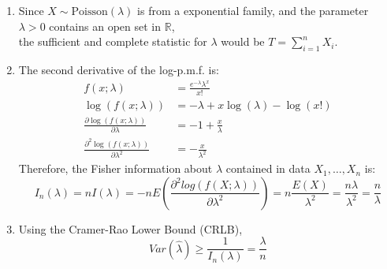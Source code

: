 \documentclass{article}
\begin{document}
\begin{enumerate}
\begin{enumerate}[label=(\roman*)]
    \item Since $X \sim \text{Poisson}(\lambda)$ is from a exponential family, and the parameter $\lambda > 0$ contains an open set in $\mathbb{R}$, \\
    the sufficient and complete statistic for $\lambda$ would be $T = \sum_{i=1}^n X_i$.

    \item The second derivative of the log-p.m.f. is:
    \begin{align*}
    f(x; \lambda) &= \frac{e^{-\lambda} \lambda^x}{x!} \\
    \log(f(x; \lambda)) &= -\lambda + x \log(\lambda) - \log(x!) \\
    \frac{\partial \log(f(x; \lambda))}{\partial \lambda} &= -1 + \frac{x}{\lambda} \\
    \frac{\partial^2 \log(f(x; \lambda))}{\partial \lambda^2} &= -\frac{x}{\lambda^2}
    \end{align*}
    Therefore, the Fisher information about $\lambda$ contained in data $X_1, \dots, X_n$ is:
    \[
    I_n(\lambda) = nI(\lambda) = -n E(\frac{\partial^2 log(f(X; \lambda))}{\partial \lambda^2}) = n\frac{E(X)}{\lambda^2} = \frac{n\lambda}{\lambda^2} = \frac{n}{\lambda}
    \]

    \item Using the Cramer-Rao Lower Bound (CRLB),
    \[
    Var(\hat{\lambda}) \geq \frac{1}{I_n(\lambda)} = \frac{\lambda}{n}
    \]


\end{enumerate}
\end{enumerate}
\end{document}
